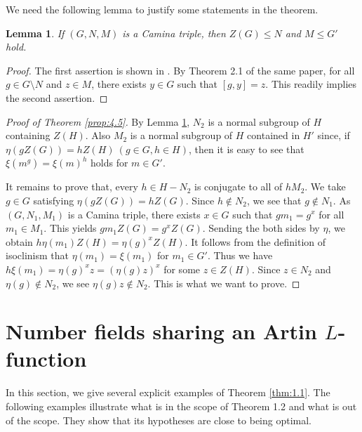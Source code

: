 \documentclass[a4paper,12pt]{article}
\newtheorem{lemma}[theorem]{Lemma}
\theoremstyle{definition}
\theoremstyle{remark}
\numberwithin{equation}{section}
\begin{document}
We need the following lemma to justify some statements in the theorem.

\begin{lemma} \label{lem:4.5}
If $(G,N,M)$ is a Camina triple, then $Z (G) \le N$ and $M \le G'$ hold.
\end{lemma}
\begin{proof}
   The first assertion is shown in \cite[Lemma 2.4 (i)]{MR3150725}. 
   By Theorem 2.1 of the same paper, for all $g \in G \setminus N$ and $z \in M$, there exists $y \in G$
   such that $[g,y]=z$. This readily implies the second assertion.
\end{proof}

\begin{proof}[Proof of Theorem \ref{prop:4.5}]
    By Lemma \ref{lem:4.5}, $N_2$ is a normal subgroup of $H$ containing $Z (H)$. Also 
    $M_2$ is a normal subgroup of $H$ contained in $H'$ since,
     if $\eta (gZ (G)) = h Z(H) \ (g \in G, h \in H)$, then it is easy to see that
    $\xi (m^g) = \xi (m)^h $ holds for $m \in G'$.

    It remains to prove that, every $h \in H-N_2$ is conjugate to all of $hM_2$.
    We take $g \in G$ satisfying $\eta (g Z(G)) = h Z(G)$. Since $h \not\in N_2$,
    we see that $g \not\in N_1$. As $(G,N_1,M_1)$ is a Camina triple, there exists $x \in G$
    such that $g m_1  = g^x $ for all $m_1 \in M_1$.
This yields $g m_1 Z(G) = g^x Z(G)$. Sending the both sides by $\eta$, we obtain 
$h \eta (m_1) Z (H) = \eta (g)^x Z (H)$. It follows from the definition of 
isoclinism that $\eta (m_1) = \xi (m_1) $ for $m_1 \in G'$. Thus we have
$h \xi (m_1) = \eta (g)^x z = (\eta (g) z)^x$  for some $z \in Z(H)$.
Since $z \in N_2$ and $\eta (g) \not\in N_2$, we see $\eta (g) z \not\in N_2$.
This is what we want to prove.
\end{proof}


\section{Number fields sharing an Artin $L$-function} \label{sec:5}
In this section, we give several explicit examples of Theorem \ref{thm:1.1}.
The following examples illustrate what is in the scope of Theorem 1.2 and what is out of the scope.
They show that its hypotheses are close to being optimal.
\end{document}

